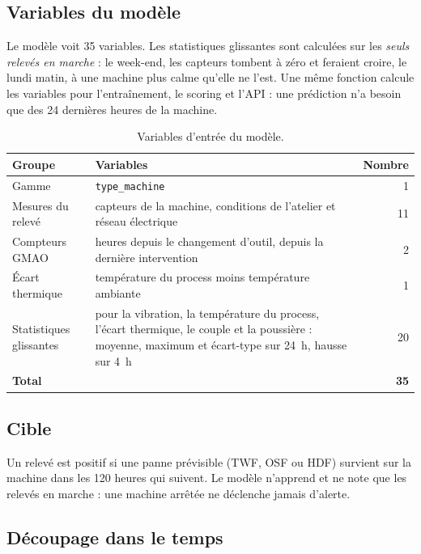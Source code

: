 \documentclass[11pt,a4paper]{article}
\newcommand{\entete}{}
\newcommand{\var}[1]{\texttt{#1}}
\begin{document}
\subsection{Variables du modèle}

Le modèle voit 35 variables. Les statistiques glissantes sont calculées sur les \emph{seuls relevés en marche} : le
week-end, les capteurs tombent à zéro et feraient croire, le lundi matin, à une machine plus calme qu'elle ne l'est.
Une même fonction calcule les variables pour l'entraînement, le scoring et l'API : une prédiction n'a besoin que des
24 dernières heures de la machine.

\begin{table}[H]
\centering\small
\begin{tabular}{@{}L{4.2cm}L{9.8cm}r@{}}
\toprule
\entete \textbf{Groupe} & \textbf{Variables} & \textbf{Nombre} \\
\midrule
Gamme & \var{type\_machine} & 1 \\
Mesures du relevé & capteurs de la machine, conditions de l'atelier et réseau électrique & 11 \\
Compteurs GMAO & heures depuis le changement d'outil, depuis la dernière intervention & 2 \\
Écart thermique & température du process moins température ambiante & 1 \\
Statistiques glissantes & pour la vibration, la température du process, l'écart thermique, le couple et la poussière :
moyenne, maximum et écart-type sur 24~h, hausse sur 4~h & 20 \\
\midrule
\textbf{Total} & & \textbf{35} \\
\bottomrule
\end{tabular}
\caption{Variables d'entrée du modèle.}
\end{table}

\subsection{Cible}

Un relevé est positif si une panne prévisible (TWF, OSF ou HDF) survient sur la machine dans les 120 heures qui
suivent. Le modèle n'apprend et ne note que les relevés en marche : une machine arrêtée ne déclenche jamais d'alerte.

\subsection{Découpage dans le temps}
\end{document}
